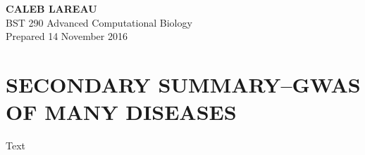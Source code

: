 \documentclass[12pt]{article}
\begin{document}
\begin{minipage}[t]{0.5\linewidth}
    \begin{flushleft}
    \textbf{
    {\huge C}{\Large ALEB} \hspace{-0.1em} 
    {\huge L}{\Large AREAU}}\\
     \hspace*{4mm} BST 290 Advanced Computational Biology \\
     \hspace*{4mm} Prepared 14 November 2016
         \end{flushleft}
\end{minipage}


\section*{\textbf{{\Large S}{\small ECONDARY} {\Large S}{\small UMMARY}{\Large --G}{\small WAS OF MANY }{\Large D}{\small ISEASES} }}
\begin{addmargin}[6.5mm]{4mm}
Text
\end{addmargin}
\end{document}
